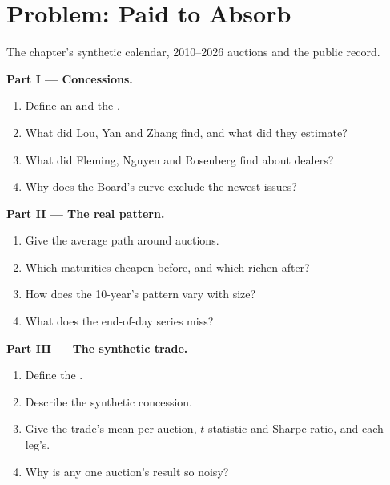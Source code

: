 \section{Problem: Paid to Absorb}

\begin{problem}\label{pb:s2:supply-trades:1}
The chapter's synthetic calendar, 2010--2026 auctions and the public record.

\medskip\noindent\textbf{Part I --- Concessions.}
\begin{enumerate}
\item Define an  and the .
\item What did Lou, Yan and Zhang find, and what did they estimate?
\item What did Fleming, Nguyen and Rosenberg find about dealers?
\item Why does the Board's curve exclude the newest issues?
\end{enumerate}

\medskip\noindent\textbf{Part II --- The real pattern.}
\begin{enumerate}[resume]
\item Give the average path around auctions.
\item Which maturities cheapen before, and which richen after?
\item How does the 10-year's pattern vary with size?
\item What does the end-of-day series miss?
\end{enumerate}

\medskip\noindent\textbf{Part III --- The synthetic trade.}
\begin{enumerate}[resume]
\item Define the .
\item Describe the synthetic concession.
\item Give the trade's mean per auction, $t$-statistic and Sharpe ratio, and each leg's.
\item Why is any one auction's result so noisy?
\end{enumerate}


\end{problem}

